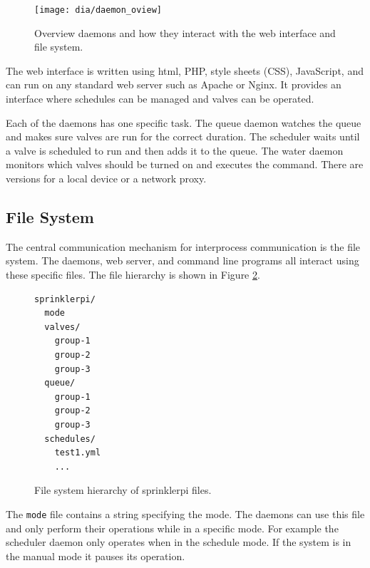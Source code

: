 \documentclass{article}
\begin{document}
\begin{figure}
\begin{center}
\texttt{[image: dia/daemon\_oview]}
\end{center}
\caption{Overview daemons and how they interact with the web interface
and file system.}
\label{fig:dov}
\end{figure}

The web interface is written using html, PHP, style sheets (CSS), JavaScript,
and can run on any standard web server such as Apache or Nginx.
It provides an interface where schedules can be managed and valves can
be operated.

Each of the daemons has one specific task.
The queue daemon watches the queue and makes sure valves are run
for the correct duration.
The scheduler waits until a valve is scheduled to run and then adds it
to the queue.
The water daemon monitors which valves should be turned on and executes
the command.
There are versions for a local device or a network proxy.

\FloatBarrier
\subsection{File System}

The central communication mechanism for interprocess communication
is the file system.  The daemons, web server, and command line programs
all interact using these specific files.
The file hierarchy is shown in Figure \ref{fig:fs}.

\begin{figure}[h!]

\begin{center}
\begin{minipage}{3in}
\begin{verbatim}
sprinklerpi/
  mode
  valves/
    group-1
    group-2
    group-3
  queue/
    group-1
    group-2
    group-3
  schedules/
    test1.yml
    ...
\end{verbatim}
\end{minipage}
\end{center}
\caption{File system hierarchy of sprinklerpi files.}
\label{fig:fs}
\end{figure}

The \verb+mode+ file contains a string specifying the mode.
The daemons can use this file and only perform their operations while
in a specific mode.
For example the scheduler daemon only operates when in the schedule mode.
If the system is in the manual mode it pauses its operation.
\end{document}
